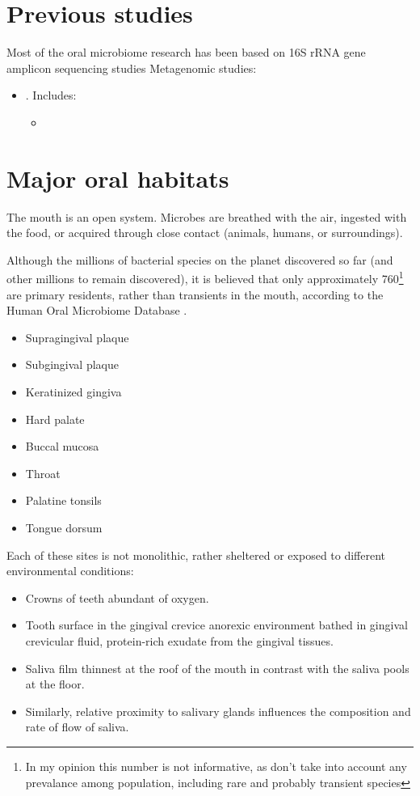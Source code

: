 \section{Previous studies}
Most of the oral microbiome research has been based on 16S rRNA gene amplicon sequencing studies \cite{Escapa2018}
Metagenomic studies:
\begin{itemize}
    \item {}. Includes:
    \begin{itemize}
        \item 
    \end{itemize}
\end{itemize}

\section{Major oral habitats}
The mouth is an open system. Microbes are breathed with the air, ingested with the food, or acquired through close 
contact (animals, humans, or surroundings). 

Although the millions of bacterial species on the planet discovered so far (and other millions to remain discovered), 
it is believed that only approximately 760\footnote{In my opinion this number is not informative, as don't 
take into account any prevalance among population, including rare and probably transient species} are primary residents, rather than transients in the mouth, according to the 
Human Oral Microbiome Database \cite{Escapa2018} .
\begin{itemize}
    \item Supragingival plaque
    \item Subgingival plaque 
    \item Keratinized gingiva 
    \item Hard palate 
    \item Buccal mucosa 
    \item Throat 
    \item Palatine tonsils 
    \item Tongue dorsum 
\end{itemize}

Each of these sites is not monolithic, rather sheltered or exposed to different environmental conditions: 
\begin{itemize}
    \item Crowns of teeth abundant of oxygen.
    \item Tooth surface in the gingival crevice anorexic environment bathed in gingival crevicular fluid, protein-rich 
    exudate from the gingival tissues. 
    \item Saliva film thinnest at the roof of the mouth in contrast with the saliva pools at the floor. 
    \item Similarly, relative proximity to salivary glands influences the composition and rate of flow of saliva. 
\end{itemize}

